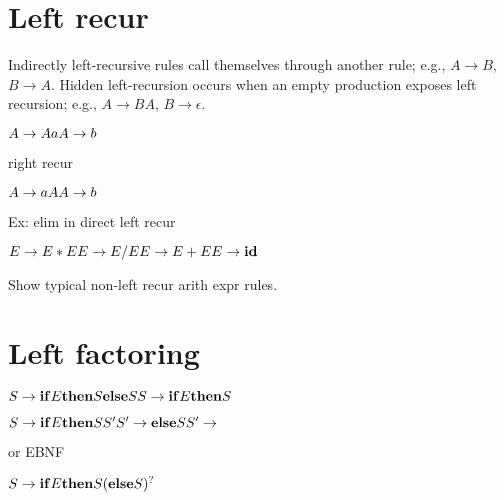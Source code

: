 \documentclass[11pt,twocolumn,nocopyright]{sigplanconf}
\begin{document}
\section{Left recur}

Indirectly left-recursive rules call themselves through another rule; e.g., $A
\rightarrow B$, $B \rightarrow A$. Hidden left-recursion occurs
when an empty production exposes left recursion; e.g., $A \rightarrow
B A$, $B \rightarrow \epsilon$.

\noindent $
A \rightarrow A a\\
A \rightarrow b\\
$

right recur

\noindent $
A \rightarrow a A\\
A \rightarrow b\\
$

Ex: elim in direct left recur

\noindent $
E \rightarrow E * E\\
E \rightarrow E / E\\
E \rightarrow E + E\\
E \rightarrow {\bf id}\\
$

Show typical non-left recur arith expr rules.

\section{Left factoring}

\noindent $
S \rightarrow {\bf if} E {\bf then} S {\bf else} S\\
S \rightarrow {\bf if} E {\bf then} S\\
$

\noindent $
S \rightarrow {\bf if} E {\bf then} S S'\\
S' \rightarrow {\bf else} S \\
S' \rightarrow
$

or EBNF

\noindent $
S \rightarrow {\bf if} E {\bf then} S ({\bf else} S)^?\\
$
\end{document}
